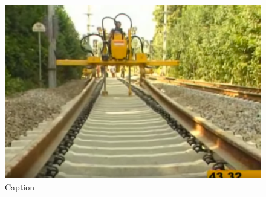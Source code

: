 \begin{figure}[h]
\begin{minipage}[b]{\w}
    \includegraphics[width=\fw]{img/13-app/03.png}
    \caption{Caption}
    \vspace{4ex}
  \end{minipage} %
\end{figure}
